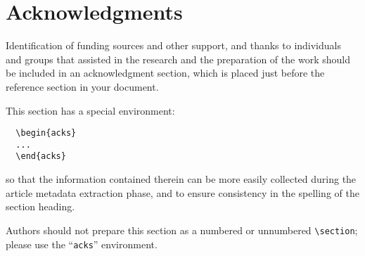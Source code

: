 \documentclass[sigconf,anonymous]{acmart}
\theoremstyle{definition}
\begin{document}




\maketitle






\section{Acknowledgments}

Identification of funding sources and other support, and thanks to
individuals and groups that assisted in the research and the
preparation of the work should be included in an acknowledgment
section, which is placed just before the reference section in your
document.

This section has a special environment:
\begin{verbatim}
  \begin{acks}
  ...
  \end{acks}
\end{verbatim}
so that the information contained therein can be more easily collected
during the article metadata extraction phase, and to ensure
consistency in the spelling of the section heading.

Authors should not prepare this section as a numbered or unnumbered {\verb|\section|}; please use the ``{\verb|acks|}'' environment.




\end{document}
